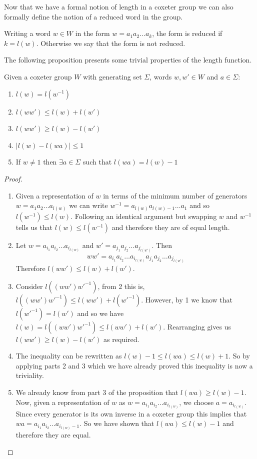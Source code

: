 \documentclass[a4paper,12pt]{article}
\begin{document}
Now that we have a formal notion of length in a coxeter group we can also formally define the notion of a reduced word in the group.

\begin{definition}
	Writing a word $w \in W$ in the form $w = a_1a_2 \ldots a_k$, the form is reduced if $k = l(w)$. Otherwise we say that the form is not reduced.
\end{definition}

The following proposition presents some trivial properties of the length function.

\begin{prop}
\label{prop_length_properties}
Given a coxeter group $W$ with generating set $\Sigma$, words $w, w' \in W$ and $a \in \Sigma$:
	\begin{enumerate}
		\item $l(w) = l(w^{-1})$
		\item $l(ww') \leq l(w) + l(w')$
		\item $l(ww') \geq l(w) - l(w')$
		\item $\vert{l(w) - l(wa)}\vert \leq 1$
		\item If $w \neq 1$ then $\exists a \in \Sigma$ such that $l(wa) = l(w) - 1$
	\end{enumerate}
\end{prop}

\begin{proof}
	\begin{enumerate}
		\item Given a representation of $w$ in terms of the minimum number of generators $w = a_1a_2 \ldots a_{l(w)}$ we can write $w^{-1} = a_{l(w)}a_{l(w) - 1} \ldots a_1$ and so $l(w^{-1}) \leq  l(w)$. Following an identical argument but swapping $w$ and $w^{-1}$ tells us that $l(w) \leq l(w^{-1})$ and therefore they are of equal length.
		\item Let $w = a_{i_1}a_{i_2} \ldots a_{i_{l(w)}}$ and $w' = a_{j_1}a_{j_2} \ldots a_{j_{l(w')}}$. Then \[ww' = a_{i_1}a_{i_2} \ldots a_{i_{l(w)}}a_{j_1}a_{j_2} \ldots a_{j_{l(w')}}\] Therefore $l(ww') \leq l(w) + l(w')$.
		\item Consider $l((ww')w'^{-1})$, from 2 this is, $l((ww')w'^{-1}) \leq l(ww') + l(w'^{-1})$. However, by 1 we know that $l(w'^{-1}) = l(w')$ and so we have $l(w) = l((ww')w'^{-1}) \leq l(ww') + l(w')$. Rearranging gives us $l(ww') \geq l(w) - l(w')$ as required.
		\item The inequality can be rewritten as $l(w) - 1 \leq l(wa) \leq l(w) + 1$. So by applying parts 2 and 3 which we have already proved this inequality is now a triviality.
		\item We already know from part 3 of the proposition that $l(wa) \geq l(w) - 1$. Now, given a representation of $w$ as $w = a_{i_1}a_{i_2} \ldots a_{i_{l(w)}}$, we choose $a = a_{i_{l(w)}}$. Since every generator is its own inverse in a coxeter group this implies that $wa = a_{i_1}a_{i_2} \ldots a_{i_{l(w)} - 1}$. So we have shown that $l(wa) \leq l(w) - 1$ and therefore they are equal.
	\end{enumerate}
\end{proof}
\end{document}
